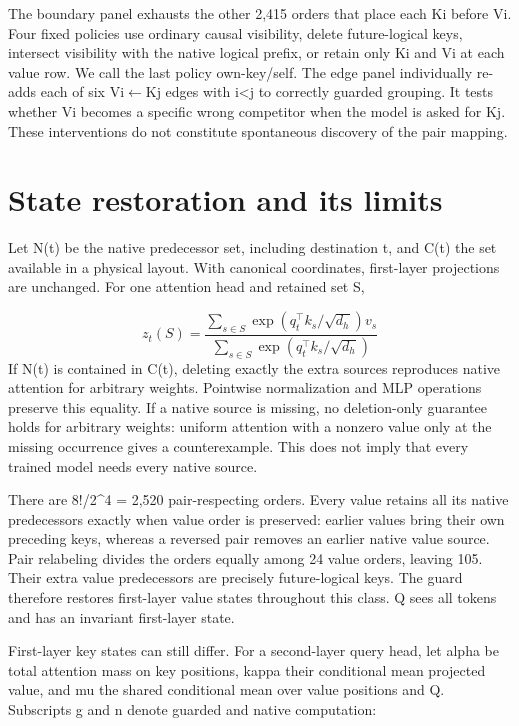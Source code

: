 \documentclass[10pt,letterpaper]{article}
\begin{document}
The boundary panel exhausts the other 2,415 orders that place each Ki before Vi. Four fixed policies use ordinary causal visibility, delete future-logical keys, intersect visibility with the native logical prefix, or retain only Ki and Vi at each value row. We call the last policy own-key/self. The edge panel individually re-adds each of six Vi\ensuremath{\leftarrow}Kj edges with i<j to correctly guarded grouping. It tests whether Vi becomes a specific wrong competitor when the model is asked for Kj. These interventions do not constitute spontaneous discovery of the pair mapping.

\section{State restoration and its limits}
Let N(t) be the native predecessor set, including destination t, and C(t) the set available in a physical layout. With canonical coordinates, first-layer projections are unchanged. For one attention head and retained set S,

\begin{equation}
z_t(S)=\frac{\sum_{s\in S}\exp(q_t^\top k_s/\sqrt{d_h})v_s}{\sum_{s\in S}\exp(q_t^\top k_s/\sqrt{d_h})}
\end{equation}
If N(t) is contained in C(t), deleting exactly the extra sources reproduces native attention for arbitrary weights. Pointwise normalization and MLP operations preserve this equality. If a native source is missing, no deletion-only guarantee holds for arbitrary weights: uniform attention with a nonzero value only at the missing occurrence gives a counterexample. This does not imply that every trained model needs every native source.

There are 8!/2\textasciicircum{}4 = 2,520 pair-respecting orders. Every value retains all its native predecessors exactly when value order is preserved: earlier values bring their own preceding keys, whereas a reversed pair removes an earlier native value source. Pair relabeling divides the orders equally among 24 value orders, leaving 105. Their extra value predecessors are precisely future-logical keys. The guard therefore restores first-layer value states throughout this class. Q sees all tokens and has an invariant first-layer state.

First-layer key states can still differ. For a second-layer query head, let alpha be total attention mass on key positions, kappa their conditional mean projected value, and mu the shared conditional mean over value positions and Q. Subscripts g and n denote guarded and native computation:
\end{document}
